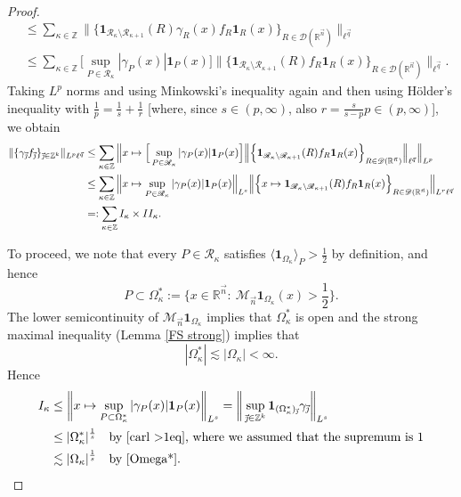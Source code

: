 \documentclass[11pt, reqno]{amsart}
\theoremstyle{definition}
\theoremstyle{remark}
\numberwithin{equation}{section}
\newcommand{\D}{\mathscr D}
\newcommand{\R}{\mathbb R}
\newcommand{\Rs}{\mathscr R}
\newcommand{\Z}{\mathbb Z}
\newcommand{\vj}{\vec{\textit{\j}}}
\newcommand{\vn}{\vec n}
\newcommand{\vq}{\vec q}
\newcommand{\one}{\mathbf{1}}
\newcommand{\ave}[1]{\langle #1\rangle}
\newcommand{\abs}[1]{|#1|}
\newcommand{\Norm}[2]{\|#1\|_{#2}}
\newcommand{\BNorm}[2]{\Big\|#1\Big\|_{#2}}
\begin{document}
\begin{proof}
\begin{align*}
&\leq\sum_{\kappa\in\Z}\BNorm{\Big\{\one_{\Rs_\kappa\setminus\Rs_{\kappa+1}}(R)
\gamma_{R}(x)f_{R}\one_R(x)\Big\}_{R\in\D(\R^{\vn})}}{\ell^{\vq}} \\
&\leq\sum_{\kappa\in\Z}\Big[\sup_{P\in\Rs_\kappa}\abs{\gamma_P(x)}\one_P(x)\Big]
\BNorm{\Big\{\one_{\Rs_\kappa\setminus\Rs_{\kappa+1}}(R)f_{R}\one_R(x)
\Big\}_{R\in\D(\R^{\vn})}}{\ell^{\vq}}.
\end{align*}
Taking $L^p$ norms and using Minkowski's inequality again
and then using H\"older's inequality with $\frac1p=\frac1s+\frac1r$ [where, since $s\in(p,\infty)$, also $r=\frac{s}{s-p}p\in(p,\infty)$], we obtain
\begin{align*}
\Norm{\{\gamma_{\vj}f_{\vj}\}_{\vj\in\mathbb Z^k}}{L^p\ell^{\vq}}
&\leq \sum_{\kappa\in\Z}\Big\| x\mapsto \Big[\sup_{P\in\Rs_\kappa}\abs{\gamma_P(x)}\one_P(x)\Big]
\BNorm{\Big\{\one_{\Rs_\kappa\setminus\Rs_{\kappa+1}}(R)f_{R}\one_R(x)
\Big\}_{R\in\D(\R^{\vn})}}{\ell^{\vq}}\Big\|_{L^p}\\
&\leq\sum_{\kappa\in\Z}
\BNorm{x\mapsto\sup_{P\in\Rs_\kappa}\abs{\gamma_P(x)}\one_P(x)}{L^s}
\BNorm{\Big\{x\mapsto \one_{\Rs_\kappa\setminus\Rs_{\kappa+1}}(R)f_{R}\one_R(x)\Big\}_{R\in\D(\R^{\vn})}}{L^r\ell^{\vq}} \\
&=:\sum_{\kappa\in\Z}I_\kappa\times II_\kappa.
\end{align*}

To proceed, we note that every $P\in\Rs_\kappa$ satisfies $\ave{\one_{\Omega_\kappa}}_{P}>\frac12$ by definition, and hence
\begin{equation*}
P\subset\Omega_\kappa^*
:=\Big\{x\in\R^{\vn}:\ \mathcal M_{\vn}\one_{\Omega_\kappa}(x)>\frac12\Big\}.
\end{equation*}
The lower semicontinuity of $\mathcal M_{\vn}\one_{\Omega_\kappa}$ implies that $\Omega_\kappa^*$ is open
and the strong maximal inequality (Lemma \ref{FS strong}) implies that
\begin{equation}\label{Omega*}
\abs{\Omega_\kappa^*}\lesssim\abs{\Omega_\kappa}<\infty.
\end{equation}
Hence
\begin{equation*}
\begin{split}
I_\kappa
  &\leq\bigg\|x\mapsto\sup_{P\subset\Omega_\kappa^*}\abs{\gamma_P(x)}\one_P(x)\bigg\|_{L^s}
  =\bigg\|\sup_{\vj\in\mathbb Z^k}\one_{(\Omega_\kappa^*)_{\vj}} \gamma_{\vj}\bigg\|_{L^s} \\
  &\leq\abs{\Omega_\kappa^*}^{\frac 1s}\quad\text{by \eqref{carl >1eq}, where we assumed that the supremum is $1$} \\
  &\lesssim\abs{\Omega_\kappa}^{\frac 1s}\quad\text{by \eqref{Omega*}}.
\end{split}
\end{equation*}



\end{proof}
\end{document}
